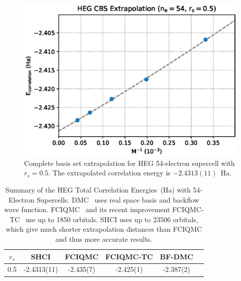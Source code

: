 \begin{figure}
  \begin{center}
  \includegraphics[width=\linewidth]{figs/cbs54e_05.eps}
  \end{center}
  \vspace{-0.2cm}
  \caption{Complete basis set extrapolation for HEG 54-electron supercell with $r_s=0.5$.
  The extrapolated correlation energy is $-2.4313(11)$~Ha.
  }
  \label{fig:cbs54e_05}
\end{figure}
\begin{table}
\caption{Summary of the HEG Total Correlation Energies~(Ha) with 54-Electron Supercells.
DMC~\cite{rios2006inhomogeneous} uses real space basis and backflow wave function.
FCIQMC~\cite{shepherd2012full} and its recent improvement FCIQMC-TC~\cite{luo2018combining} use up to 1850 orbitals.
SHCI uses up to 23506 orbitals, which give much shorter extrapolation distances than FCIQMC and thus more accurate results.
}
\label{tab:results54}
\begin{tabular}{| c || c || c | c | c | c |}
 \hline
 $r_s$ & SHCI & FCIQMC & FCIQMC-TC & BF-DMC \\
 \hline\hline
 0.5 & -2.4313(11) & -2.435(7) & -2.425(1) & -2.387(2) \\
 \hline
 \hline
\end{tabular}
\end{table}